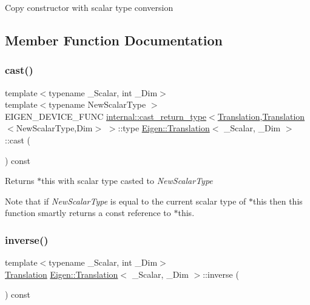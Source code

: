 Copy constructor with scalar type conversion 

\subsection{Member Function Documentation}
\mbox{\label{class_eigen_1_1_translation_a1d30bbadbafd009cda142f15ff7abcc2}} 
\subsubsection{\texorpdfstring{cast()}{cast()}}
{\footnotesize\ttfamily template$<$typename \+\_\+\+Scalar, int \+\_\+\+Dim$>$ \\
template$<$typename New\+Scalar\+Type $>$ \\
E\+I\+G\+E\+N\+\_\+\+D\+E\+V\+I\+C\+E\+\_\+\+F\+U\+NC \mbox{\hyperlink{struct_eigen_1_1internal_1_1cast__return__type}{internal\+::cast\+\_\+return\+\_\+type}}$<$\mbox{\hyperlink{class_eigen_1_1_translation}{Translation}},\mbox{\hyperlink{class_eigen_1_1_translation}{Translation}}$<$New\+Scalar\+Type,Dim$>$ $>$\+::type \mbox{\hyperlink{class_eigen_1_1_translation}{Eigen\+::\+Translation}}$<$ \+\_\+\+Scalar, \+\_\+\+Dim $>$\+::cast (\begin{DoxyParamCaption}{ }\end{DoxyParamCaption}) const\hspace{0.3cm}{\ttfamily [inline]}}

\begin{DoxyReturn}{Returns}
{\ttfamily $\ast$this} with scalar type casted to {\itshape New\+Scalar\+Type} 
\end{DoxyReturn}
Note that if {\itshape New\+Scalar\+Type} is equal to the current scalar type of {\ttfamily $\ast$this} then this function smartly returns a const reference to {\ttfamily $\ast$this}. \mbox{\label{class_eigen_1_1_translation_aa72ee6bccce7f26cbef57550308e6aaf}} 
\subsubsection{\texorpdfstring{inverse()}{inverse()}}
{\footnotesize\ttfamily template$<$typename \+\_\+\+Scalar, int \+\_\+\+Dim$>$ \\
\mbox{\hyperlink{class_eigen_1_1_translation}{Translation}} \mbox{\hyperlink{class_eigen_1_1_translation}{Eigen\+::\+Translation}}$<$ \+\_\+\+Scalar, \+\_\+\+Dim $>$\+::inverse (\begin{DoxyParamCaption}{ }\end{DoxyParamCaption}) const\hspace{0.3cm}{\ttfamily [inline]}}

